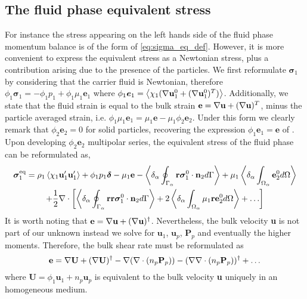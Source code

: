 
\subsection{The fluid phase equivalent stress}
For instance the stress appearing on the left hands side of the fluid phase momentum balance is of the form of \ref{eq:sigma_eq_def}. 
However, it is more convenient to express the equivalent stress as a Newtonian stress, plus a contribution arising due to the presence of the particles. 
We first reformulate $\bm{\sigma}_1$ by considering that the carrier fluid is Newtonian, therefore $\phi_1 \bm{\sigma}_1 = - \phi_1 p_1 + \phi_1 \mu_1 \textbf{e}_1$ where $\phi_1 \bm{e}_1 = \left<\chi_1  (\mathbf{\nabla} \textbf{u}_1^0 + (\mathbf{\nabla} \textbf{u}_1^0)^T)\right>$. 
Additionally, we state that the fluid strain is equal to the bulk strain $\textbf{e} = \mathbf{\nabla} \textbf{u}+ (\mathbf{\nabla} \textbf{u})^T$, minus the particle averaged strain, i.e. $\phi_1 \mu_1 \textbf{e}_1 = \mu_1\textbf{e} - \mu_1 \phi_2 \textbf{e}_2$. 
Under this form we clearly remark that $\phi_2 \textbf{e}_2 = 0$ for solid particles, recovering the expression $\phi_1 \textbf{e}_1 = \textbf{e}$ of \citet{jackson1997locally}. 
Upon developing $\phi_2 \textbf{e}_2$ multipolar series, the equivalent stress of the fluid phase can be reformulated as, 
\begin{multline}
    \bm{\sigma}^\text{eq}_1 = 
    \rho_1\left<\chi_1\textbf{u}_1'\textbf{u}_1'\right> 
    + \phi_1 p_1 \bm\delta 
    - \mu_1 \textbf{e} 
    - \left<\delta_\alpha \oint_{\Gamma_\alpha} \textbf{r}\bm{\sigma}_1^0\cdot \textbf{n}_2 d\Gamma\right>
    + \mu_1 \left<\delta_\alpha \int_{\Omega_\alpha} \textbf{e}_2^0 d\Omega\right>\\
    + \frac{1}{2} \mathbf{\nabla}\cdot \left[
        \left<\delta_\alpha \oint_{\Gamma_\alpha} \textbf{rr}\bm{\sigma}_1^0\cdot \textbf{n}_2 d\Gamma\right>
        + 2\left<\delta_\alpha \int_{\Omega_\alpha} \mu_1 \textbf{re}_2^0  d\Omega\right>
        + \ldots
    \right]
    \label{eq:sigma_eq_0}
\end{multline} 
It is worth noting that $\textbf{e} = \mathbf{\nabla} \textbf{u} + (\mathbf{\nabla} \textbf{u})^\dagger$. 
Nevertheless, the bulk velocity \textbf{u} is not part of our unknown instead we solve for $\textbf{u}_1$, $\textbf{u}_p$, $\textbf{P}_p$ and eventually the higher moments. 
Therefore, the bulk shear rate must be reformulated as 
\begin{equation*}
    \textbf{e}
    = 
    \mathbf{\nabla} \textbf{U} + (\mathbf{\nabla} \textbf{U})^\dagger
    - \mathbf{\nabla} (\mathbf{\nabla}\cdot (n_p \textbf{P}_p))
    - (\mathbf{\nabla} \mathbf{\nabla}\cdot (n_p \textbf{P}_p))^\dagger
    + \ldots
\end{equation*}
where $\textbf{U} = \phi_1 \textbf{u}_1 + n_p \textbf{u}_p$ is equivalent to the bulk velocity \textbf{u} uniquely in an homogeneous medium. 

